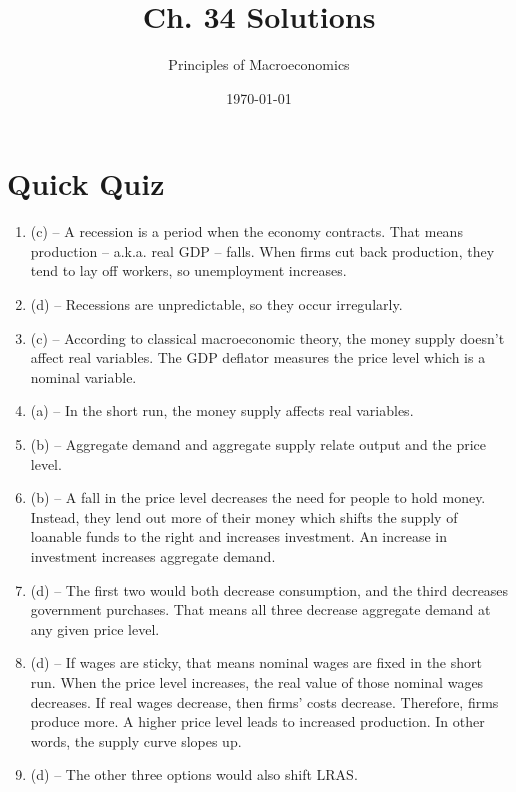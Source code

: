 \documentclass{article}
\title{Ch. 34 Solutions}
\author{Principles of Macroeconomics}
\date{\today}
\begin{document}
\maketitle

\section*{Quick Quiz}

\begin{enumerate}

\item (c) -- A recession is a period when the economy contracts. That means production -- a.k.a. real GDP -- falls. When firms cut back production, they tend to lay off workers, so unemployment increases.

\item (d) -- Recessions are unpredictable, so they occur irregularly. 

\item (c) -- According to classical macroeconomic theory, the money supply doesn't affect real variables. The GDP deflator measures the price level which is a nominal variable.

\item (a) -- In the short run, the money supply affects real variables.

\item (b) -- Aggregate demand and aggregate supply relate output and the price level.

\item (b) -- A fall in the price level decreases the need for people to hold money. Instead, they lend out more of their money which shifts the supply of loanable funds to the right and increases investment. An increase in investment increases aggregate demand.

\item (d) -- The first two would both decrease consumption, and the third decreases government purchases. That means all three decrease aggregate demand at any given price level.

\item (d) -- If wages are sticky, that means nominal wages are fixed in the short run. When the price level increases, the real value of those nominal wages decreases. If real wages decrease, then firms' costs decrease. Therefore, firms produce more. A higher price level leads to increased production. In other words, the supply curve slopes up.

\item (d) -- The other three options would also shift LRAS. 


\end{enumerate}
\end{document}
